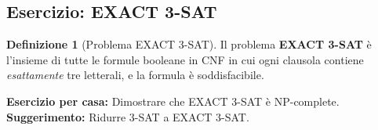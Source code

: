 \documentclass[a4paper]{article}
\theoremstyle{definition} %
\newtheorem{definition}{Definizione}
\begin{document}
\subsection{Esercizio: EXACT 3-SAT}
\begin{definition}[Problema EXACT 3-SAT]
Il problema \textbf{EXACT 3-SAT} è l'insieme di tutte le formule booleane in CNF in cui ogni clausola contiene \emph{esattamente} tre letterali, e la formula è soddisfacibile.
\end{definition}

\textbf{Esercizio per casa:} Dimostrare che EXACT 3-SAT è NP-complete.
\textbf{Suggerimento:} Ridurre 3-SAT a EXACT 3-SAT.
\end{document}
